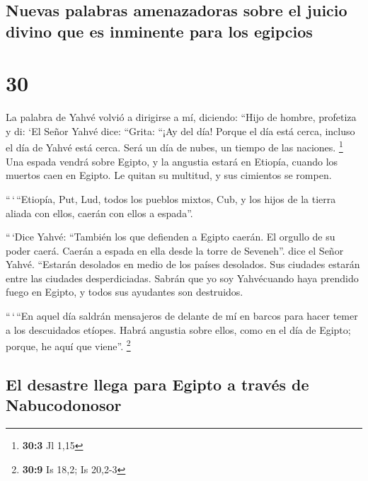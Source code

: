 \hypertarget{nuevas-palabras-amenazadoras-sobre-el-juicio-divino-que-es-inminente-para-los-egipcios}{%
\subsection{Nuevas palabras amenazadoras sobre el juicio divino que es
inminente para los
egipcios}\label{nuevas-palabras-amenazadoras-sobre-el-juicio-divino-que-es-inminente-para-los-egipcios}}

\hypertarget{section-29}{%
\section{30}\label{section-29}}

 La palabra de Yahvé volvió a dirigirse a mí, diciendo:
 ``Hijo de hombre, profetiza y di: `El Señor Yahvé dice:
``Grita: ``¡Ay del día!  Porque el día está cerca, incluso
el día de Yahvé está cerca. Será un día de nubes, un tiempo de las
naciones. \footnote{\textbf{30:3} Jl 1,15}  Una espada
vendrá sobre Egipto, y la angustia estará en Etiopía, cuando los muertos
caen en Egipto. Le quitan su multitud, y sus cimientos se rompen.

 ``\,`\,``Etiopía, Put, Lud, todos los pueblos mixtos,
Cub, y los hijos de la tierra aliada con ellos, caerán con ellos a
espada''.

 ``\,`Dice Yahvé: ``También los que defienden a Egipto
caerán. El orgullo de su poder caerá. Caerán a espada en ella desde la
torre de Seveneh''. dice el Señor Yahvé.  ``Estarán
desolados en medio de los países desolados. Sus ciudades estarán entre
las ciudades desperdiciadas.  Sabrán que yo soy
Yahvécuando haya prendido fuego en Egipto, y todos sus ayudantes son
destruidos.

 ``\,`\,``En aquel día saldrán mensajeros de delante de mí
en barcos para hacer temer a los descuidados etíopes. Habrá angustia
sobre ellos, como en el día de Egipto; porque, he aquí que viene''.
\footnote{\textbf{30:9} Is 18,2; Is 20,2-3}

\hypertarget{el-desastre-llega-para-egipto-a-travuxe9s-de-nabucodonosor}{%
\subsection{El desastre llega para Egipto a través de
Nabucodonosor}\label{el-desastre-llega-para-egipto-a-travuxe9s-de-nabucodonosor}}

